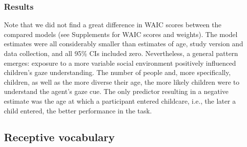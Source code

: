 \documentclass[
  man,floatsintext]{apa6}
\begin{document}
\hypertarget{results}{%
\subsubsection{Results}\label{results}}

\begin{table}
\centering
{}
\end{table}

Note that we did not find a great difference in WAIC scores between the compared models (see Supplements for WAIC scores and weights). The model estimates were all considerably smaller than estimates of age, study version and data collection, and all 95\% CIs included zero. Nevertheless, a general pattern emerges: exposure to a more variable social environment positively influenced children's gaze understanding. The number of people and, more specifically, children, as well as the more diverse their age, the more likely children were to understand the agent's gaze cue. The only predictor resulting in a negative estimate was the age at which a participant entered childcare, i.e., the later a child entered, the better performance in the task.

\hypertarget{receptive-vocabulary}{%
\subsection{Receptive vocabulary}\label{receptive-vocabulary}}
\end{document}
